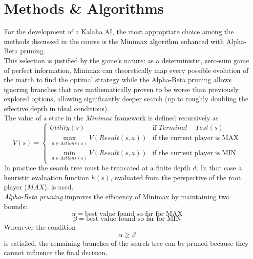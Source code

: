 \documentclass[a4paper,11pt]{article}
\begin{document}
\section{Methods \& Algorithms}
For the development of a Kalaha AI, the most appropriate choice among the methods discussed in the course is the Minimax algorithm enhanced with Alpha-Beta pruning. \\
This selection is justified by the game's nature: as a deterministic, zero-sum game of perfect information, Minimax can theoretically map every possible evolution of the match to find the optimal strategy while the Alpha-Beta pruning allows ignoring branches that are mathematically proven to be worse than previously explored options, allowing significantly deeper search (up to roughly doubling the effective depth in ideal conditions). \\
The value of a state in the \textit{Minimax} framework is defined recursively as
\[
V(s)=
\begin{cases}
Utility(s) & \text{if } Terminal-Test(s) \\
\max_{a\in Actions(s)} V(Result(s,a)) & \text{if the current player is MAX} \\
\min_{a\in Actions(s)} V(Result(s,a)) & \text{if the current player is MIN}
\end{cases}
\]
In practice the search tree must be truncated at a finite depth $d$. In that case a heuristic evaluation function $h(s)$, evaluated from the perspective of the root player ($MAX$), is used.\\
\textit{Alpha-Beta pruning} improves the efficiency of Minimax by maintaining two bounds:
\[
\alpha = \text{best value found so far for MAX}
\]
\[
\beta = \text{best value found so far for MIN}
\]
Whenever the condition
\[
\alpha \geq \beta
\]
is satisfied, the remaining branches of the search tree can be pruned because they cannot influence the final decision.
\end{document}
